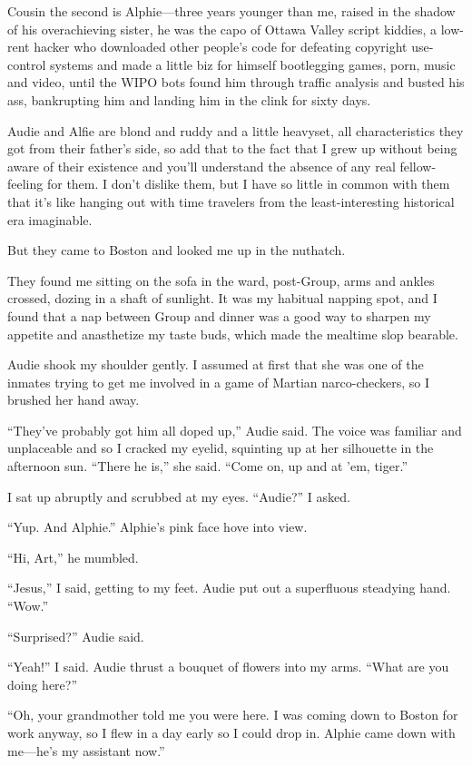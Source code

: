 Cousin the second is Alphie—three years younger than me, raised in
the shadow of his overachieving sister, he was the capo of Ottawa
Valley script kiddies, a low-rent hacker who downloaded other
people’s code for defeating copyright use-control systems and made
a little biz for himself bootlegging games, porn, music and video,
until the WIPO bots found him through traffic analysis and busted
his ass, bankrupting him and landing him in the clink for sixty
days.

Audie and Alfie are blond and ruddy and a little heavyset, all
characteristics they got from their father’s side, so add that to
the fact that I grew up without being aware of their existence and
you’ll understand the absence of any real fellow-feeling for them.
I don’t dislike them, but I have so little in common with them that
it’s like hanging out with time travelers from the
least-interesting historical era imaginable.

But they came to Boston and looked me up in the nuthatch.

They found me sitting on the sofa in the ward, post-Group, arms and
ankles crossed, dozing in a shaft of sunlight. It was my habitual
napping spot, and I found that a nap between Group and dinner was a
good way to sharpen my appetite and anasthetize my taste buds,
which made the mealtime slop bearable.

Audie shook my shoulder gently. I assumed at first that she was one
of the inmates trying to get me involved in a game of Martian
narco-checkers, so I brushed her hand away.

“They’ve probably got him all doped up,” Audie said. The voice was
familiar and unplaceable and so I cracked my eyelid, squinting up
at her silhouette in the afternoon sun. “There he is,” she said.
“Come on, up and at ’em, tiger.”

I sat up abruptly and scrubbed at my eyes. “Audie?” I asked.

“Yup. And Alphie.” Alphie’s pink face hove into view.

“Hi, Art,” he mumbled.

“Jesus,” I said, getting to my feet. Audie put out a superfluous
steadying hand. “Wow.”

“Surprised?” Audie said.

“Yeah!” I said. Audie thrust a bouquet of flowers into my arms.
“What are you doing here?”

“Oh, your grandmother told me you were here. I was coming down to
Boston for work anyway, so I flew in a day early so I could drop
in. Alphie came down with me—he’s my assistant now.”

